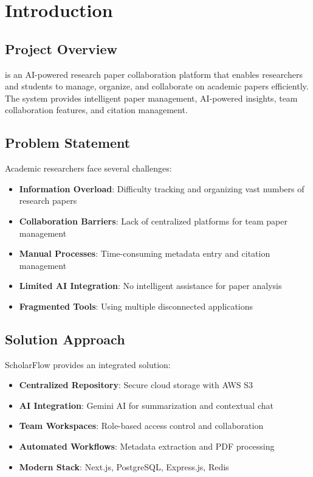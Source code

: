 \section{Introduction}
\label{sec:introduction}

\subsection{Project Overview}

\projectname{} is an AI-powered research paper collaboration platform that enables researchers and students to manage, organize, and collaborate on academic papers efficiently. The system provides intelligent paper management, AI-powered insights, team collaboration features, and citation management.

\subsection{Problem Statement}

Academic researchers face several challenges:

\begin{itemize}[leftmargin=*,topsep=5pt,itemsep=3pt]
    \item \textbf{Information Overload}: Difficulty tracking and organizing vast numbers of research papers
    \item \textbf{Collaboration Barriers}: Lack of centralized platforms for team paper management  
    \item \textbf{Manual Processes}: Time-consuming metadata entry and citation management
    \item \textbf{Limited AI Integration}: No intelligent assistance for paper analysis
    \item \textbf{Fragmented Tools}: Using multiple disconnected applications
\end{itemize}

\subsection{Solution Approach}

ScholarFlow provides an integrated solution:

\begin{itemize}[leftmargin=*,topsep=5pt,itemsep=3pt]
    \item \textbf{Centralized Repository}: Secure cloud storage with AWS S3
    \item \textbf{AI Integration}: Gemini AI for summarization and contextual chat
    \item \textbf{Team Workspaces}: Role-based access control and collaboration
    \item \textbf{Automated Workflows}: Metadata extraction and PDF processing
    \item \textbf{Modern Stack}: Next.js, PostgreSQL, Express.js, Redis
\end{itemize}
